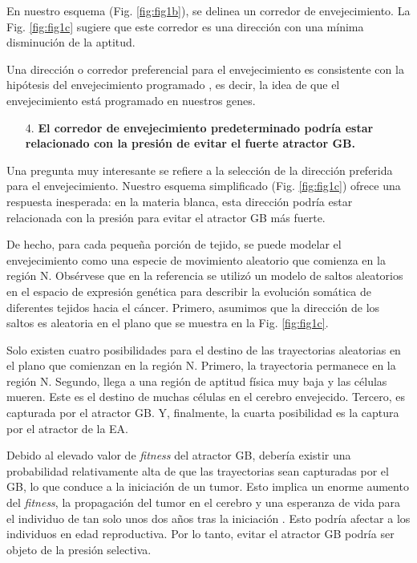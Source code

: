 En nuestro esquema (Fig. \ref{fig:fig1b}), se delinea un corredor de envejecimiento. La Fig. \ref{fig:fig1c} sugiere que este corredor es una dirección con una mínima disminución de la aptitud.

Una dirección o corredor preferencial para el envejecimiento es consistente con la hipótesis del envejecimiento programado \cite{Magalh_es_2012, Gems_2022}, es decir, la idea de que el envejecimiento está programado en nuestros genes.

\begin{enumerate}
	\item[4.] \textbf{El corredor de envejecimiento predeterminado podría estar relacionado con la presión de evitar el fuerte atractor GB.}
\end{enumerate}

Una pregunta muy interesante se refiere a la selección de la dirección preferida para el envejecimiento. Nuestro esquema simplificado (Fig. \ref{fig:fig1c}) ofrece una respuesta inesperada: en la materia blanca, esta dirección podría estar relacionada con la presión para evitar el atractor GB más fuerte.

De hecho, para cada pequeña porción de tejido, se puede modelar el envejecimiento como una especie de movimiento aleatorio que comienza en la región N. Obsérvese que en la referencia \cite{Herrero_2022} se utilizó un modelo de saltos aleatorios en el espacio de expresión genética para describir la evolución somática de diferentes tejidos hacia el cáncer. Primero, asumimos que la dirección de los saltos es aleatoria en el plano que se muestra en la Fig. \ref{fig:fig1c}.

Solo existen cuatro posibilidades para el destino de las trayectorias aleatorias en el plano que comienzan en la región N. Primero, la trayectoria permanece en la región N. Segundo, llega a una región de aptitud física muy baja y las células mueren. Este es el destino de muchas células en el cerebro envejecido. Tercero, es capturada por el atractor GB. Y, finalmente, la cuarta posibilidad es la captura por el atractor de la EA.

Debido al elevado valor de \textit{fitness} del atractor GB, debería existir una probabilidad relativamente alta de que las trayectorias sean capturadas por el GB, lo que conduce a la iniciación de un tumor. Esto implica un enorme aumento del \textit{fitness}, la propagación del tumor en el cerebro y una esperanza de vida para el individuo de tan solo unos dos años tras la iniciación \cite{Poon_2020}. Esto podría afectar a los individuos en edad reproductiva. Por lo tanto, evitar el atractor GB podría ser objeto de la presión selectiva.

